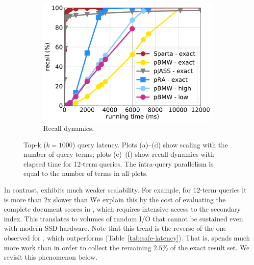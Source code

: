 {{\begin{figure}[tbh]
\begin{subfigure}{0.32\textwidth}
      \end{subfigure}%
	\hfill 
      \begin{subfigure}{0.32\textwidth}
      	\includegraphics[width=\textwidth]{figures/cumulative_12threads_cluewebX10.pdf}
        \caption{Recall dynamics, \cwten}
	\label{fig:dynamics-cluewebX10}
      \end{subfigure}  

\caption{Top-k ($k=1000$) query latency. Plots (a)--(d) show scaling with the number of query terms; plots (e)--(f) show recall dynamics with elapsed time for 12-term queries.  
The intra-query parallelism is equal to the number of terms in all plots. }
\end{figure}

%

In contrast, \pRA\/ exhibits much weaker scalability. For example, for $12$-term queries it is more than $2$x slower than \alg\. 
We explain this by the cost of evaluating the complete 
document scores in \pRA, which requires intensive access to the secondary index. This translates to volumes of random 
I/O that cannot be sustained even with modern SSD hardware. Note that this trend is the reverse of the one observed for \pRA\ex, 
which outperforms \alg\ex\/ (Table~\ref{tab:safe-latency}). That is, \alg\/ spends much more work than \pRA\/ 
in order to collect the remaining $2.5\%$ of the exact result set. We revisit this phenomenon  below. 


}}
